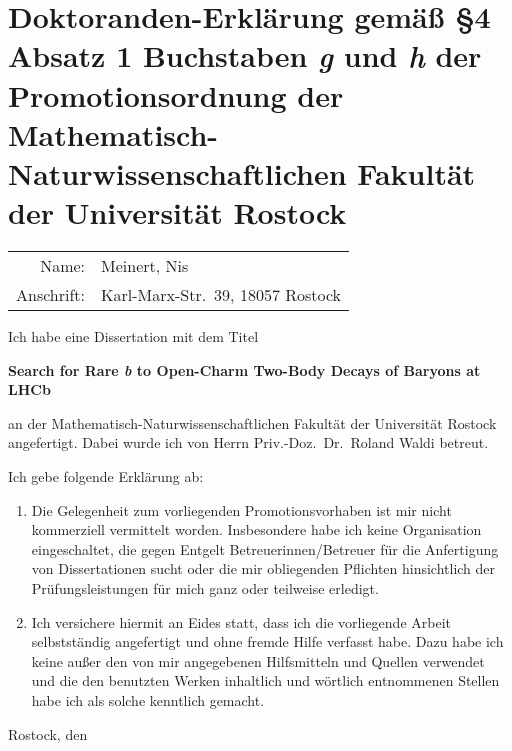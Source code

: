 \documentclass[paper=a4]{scrartcl}
\begin{document}
\thispagestyle{empty}

\section*{Doktoranden-Erklärung gemäß \S{}4 Absatz 1 Buchstaben \textit{g} und \textit{h} der Promotionsordnung der Mathematisch-Naturwissenschaftlichen Fakultät der Universität Rostock}

\begin{center}
    \begin{tabular}{rl}
        Name: & Meinert, Nis \\
        Anschrift: & Karl-Marx-Str.\ 39, 18057 Rostock \\
    \end{tabular}
\end{center}

Ich habe eine Dissertation mit dem Titel
\begin{center}
    \textbf{Search for Rare \textit{b} to Open-Charm Two-Body Decays of Baryons at LHCb}
\end{center}
an der Mathematisch-Naturwissenschaftlichen Fakultät der Universität Rostock angefertigt. 
Dabei wurde ich von Herrn Priv.-Doz.\ Dr.\ Roland Waldi betreut.

Ich gebe folgende Erklärung ab:
\begin{enumerate}
    \item Die Gelegenheit zum vorliegenden Promotionsvorhaben ist mir nicht kommerziell
vermittelt worden. Insbesondere habe ich keine Organisation eingeschaltet, die
gegen Entgelt Betreuerinnen/Betreuer für die Anfertigung von Dissertationen sucht oder die mir obliegenden Pflichten hinsichtlich der Prüfungsleistungen für mich ganz oder teilweise erledigt.
    \item Ich versichere hiermit an Eides statt, dass ich die vorliegende Arbeit selbstständig angefertigt und ohne fremde Hilfe verfasst habe. Dazu habe ich keine außer den von mir angegebenen Hilfsmitteln und Quellen verwendet und die den benutzten Werken inhaltlich und wörtlich entnommenen Stellen habe ich als solche kenntlich gemacht.
\end{enumerate}

\vspace{2cm}

Rostock, den
\end{document}
